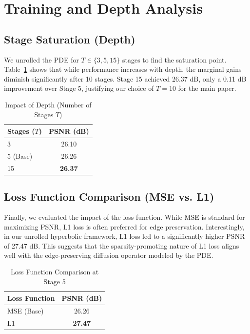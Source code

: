 \documentclass[11pt]{article}
\begin{document}
\section{Training and Depth Analysis}

\subsection{Stage Saturation (Depth)}

We unrolled the PDE for $T \in \{3, 5, 15\}$ stages to find the saturation point. Table~\ref{tab:depth_ablation} shows that while performance increases with depth, the marginal gains diminish significantly after 10 stages. Stage 15 achieved 26.37 dB, only a 0.11 dB improvement over Stage 5, justifying our choice of $T=10$ for the main paper.

\begin{table}[h]
	\centering
	\caption{Impact of Depth (Number of Stages $T$)}
	\label{tab:depth_ablation}
	\begin{tabular}{l c}
		\toprule
		Stages ($T$) & PSNR (dB)      \\
		\midrule
		3            & 26.10          \\
		5 (Base)     & 26.26          \\
		15           & \textbf{26.37} \\
		\bottomrule
	\end{tabular}
\end{table}

\subsection{Loss Function Comparison (MSE vs. L1)}

Finally, we evaluated the impact of the loss function. While MSE is standard for maximizing PSNR, L1 loss is often preferred for edge preservation. Interestingly, in our unrolled hyperbolic framework, L1 loss led to a significantly higher PSNR of 27.47 dB. This suggests that the sparsity-promoting nature of L1 loss aligns well with the edge-preserving diffusion operator modeled by the PDE.

\begin{table}[h]
	\centering
	\caption{Loss Function Comparison at Stage 5}
	\label{tab:loss_ablation}
	\begin{tabular}{l c}
		\toprule
		Loss Function & PSNR (dB)      \\
		\midrule
		MSE (Base)    & 26.26          \\
		L1            & \textbf{27.47} \\
		\bottomrule
	\end{tabular}
\end{table}
\end{document}
